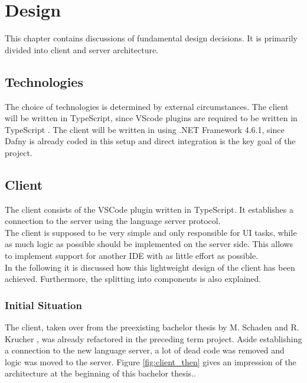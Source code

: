 \section{Design}
This chapter contains discussions of fundamental design decisions.
It is primarily divided into client and server architecture.

\subsection{Technologies}
The choice of technologies is determined by external circumstances.
The client will be written in TypeScript, since VScode plugins are required to be written in TypeScript \cite{vscodeAPI}.
The client will be written in  \Csharp using .NET Framework 4.6.1, since Dafny is already coded in this setup and direct integration is the key goal of the project.


\subsection{Client}
The client consists of the VSCode plugin written in TypeScript.
It establishes a connection to the server using the language server protocol.\\

The client is supposed to be very simple and only responsible for UI tasks, while as much logic as possible should be implemented on the server side.
This allows to implement support for another IDE with as little effort as possible. \\

In the following it is discussed how this lightweight design of the client has been achieved.
Furthermore, the splitting into components is also explained.

\subsubsection{Initial Situation}
The client, taken over from the preexisting bachelor thesis by M. Schaden and R. Krucher \cite{ba}, was already refactored in the preceding term project.
Aside establishing a connection to the new language server, a lot of dead code was removed and logic was moved to the server.
Figure \ref{fig:client_then} gives an impression of the architecture at the beginning of this bachelor thesis..

